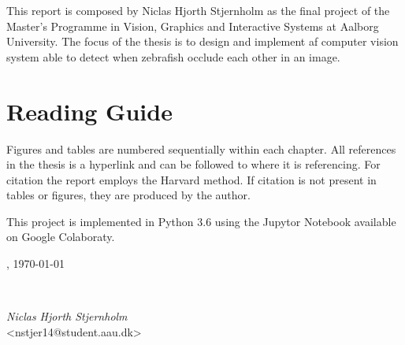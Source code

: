 This report is composed by Niclas Hjorth Stjernholm as the final project of the Master's Programme in Vision, Graphics and Interactive Systems at Aalborg University. The focus of the thesis is to design and implement af computer vision system able to detect when zebrafish occlude each other in an image.

{\let\clearpage\relax \chapter*{Reading Guide}}
\noindent Figures and tables are numbered sequentially within each chapter. All references in the thesis is a hyperlink and can be followed to where it is referencing.
For citation the report employs the Harvard method. If citation is not present in tables or figures, they are produced by the author.

\noindent This project is implemented in Python 3.6 using the Jupytor Notebook available on Google Colaboraty.

\vspace{\baselineskip}\hfill \AAU, \today
\vfill\noindent
\begin{center}
\
\begin{minipage}[b]{0.45\textwidth}
  \centering
  \textit{Niclas Hjorth Stjernholm}\\
  {\footnotesize <nstjer14@student.aau.dk>}
\end{minipage}

\end{center}


